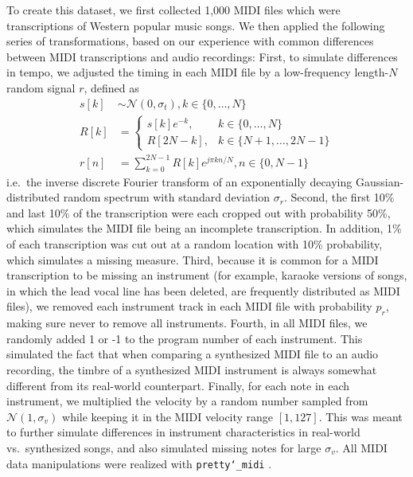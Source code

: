 \documentclass{article}
\begin{document}
To create this dataset, we first collected 1,000 MIDI files which were transcriptions of Western popular music songs.
We then applied the following series of transformations, based on our experience with common differences between MIDI transcriptions and audio recordings:
First, to simulate differences in tempo, we adjusted the timing in each MIDI file by a low-frequency length-$N$ random signal $r$, defined as
\begin{align*}
s[k] &\sim \mathcal{N}(0, \sigma_t), k \in \{0, \ldots, N\}\\
R[k] &= \begin{cases}
s[k]e^{-k}, &k \in \{0, \ldots, N\}\\
R[2N - k], &k \in \{N + 1, \ldots, 2N - 1\}
\end{cases}\\
r[n] &= \sum_{k = 0}^{2N - 1} R[k]e^{j\pi kn/N}, n \in \{0, N - 1\}
\end{align*}
i.e.\ the inverse discrete Fourier transform of an exponentially decaying Gaussian-distributed random spectrum with standard deviation $\sigma_r$.
Second, the first 10\% and last 10\% of the transcription were each cropped out with probability 50\%, which simulates the MIDI file being an incomplete transcription.
In addition, 1\% of each transcription was cut out at a random location with 10\% probability, which simulates a missing measure.
Third, because it is common for a MIDI transcription to be missing an instrument (for example, karaoke versions of songs, in which the lead vocal line has been deleted, are frequently distributed as MIDI files), we removed each instrument track in each MIDI file with probability $p_r$, making sure never to remove all instruments.
Fourth, in all MIDI files, we randomly added 1 or -1 to the program number of each instrument.
This simulated the fact that when comparing a synthesized MIDI file to an audio recording, the timbre of a synthesized MIDI instrument is always somewhat different from its real-world counterpart.
Finally, for each note in each instrument, we multiplied the velocity by a random number sampled from $\mathcal{N}(1, \sigma_v)$ while keeping it in the MIDI velocity range $[1, 127]$.
This was meant to further simulate differences in instrument characteristics in real-world vs.\ synthesized songs, and also simulated missing notes for large $\sigma_v$.
All MIDI data manipulations were realized with \texttt{pretty\char`_midi} \cite{raffel2014pretty_midi}.
\end{document}
